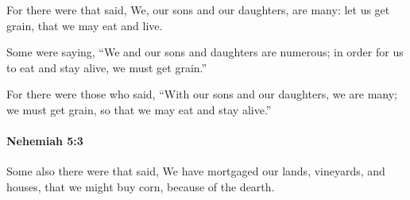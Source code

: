 			\begin{versebox}
					\item[BHS] 
					\item[LXX] 
					\item[ASV] For there were that said, We, our sons and our daughters, are many: let us get grain, that we may eat and live.
					\item[NIV] Some were saying, “We and our sons and daughters are numerous; in order for us to eat and stay alive, we must get grain.”
					\item[NRSV] For there were those who said, “With our sons and our daughters, we are many; we must get grain, so that we may eat and stay alive.”
			\end{versebox}

		\paragraph{Nehemiah 5:3} %
			\label{NEHEMIAH-5-3}

			Some also there were that said, We have mortgaged our lands, vineyards, and houses, that we might buy corn, because of the dearth.

